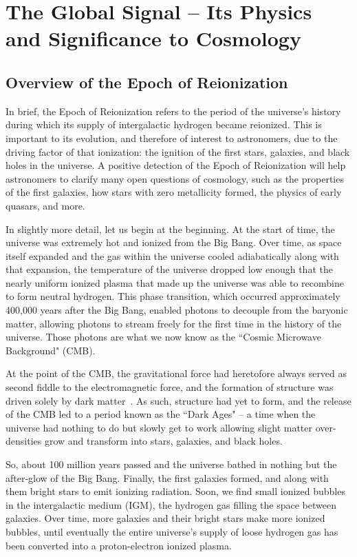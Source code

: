 \chapter{The Global Signal -- Its Physics and Significance to Cosmology}

\section{Overview of the Epoch of Reionization}

In brief, the Epoch of Reionization refers to the period of the universe's 
history during which its supply of intergalactic hydrogen became reionized.  
This is important to its evolution, and therefore of interest to astronomers, 
due to the driving factor of that ionization: the ignition of the first stars, 
galaxies, and black holes in the universe. A positive detection of the Epoch of 
Reionization will help astronomers to clarify many open questions of cosmology, 
such as the properties of the first galaxies, how stars with zero metallicity 
formed, the physics of early quasars, and more.

In slightly more detail, let us begin at the beginning. At the start of time, 
the universe was extremely hot and ionized from the Big Bang. Over time, as 
space itself expanded and the gas within the universe cooled adiabatically 
along with that expansion, the temperature of the universe dropped low enough 
that the nearly uniform ionized plasma that made up the universe was able to 
recombine to form neutral hydrogen. This phase transition, which occurred 
approximately 400,000 years after the Big Bang, enabled photons to decouple 
from the baryonic matter, allowing photons to stream freely for the first time 
in the history of the universe.  Those photons are what we now know as the 
``Cosmic Microwave Background" (CMB).

At the point of the CMB, the gravitational force had heretofore always served 
as second fiddle to the electromagnetic force, and the formation of structure 
was driven solely by dark matter~\citep{zaroubi2012}.  As such, structure had 
yet to form, and the release of the CMB led to a period known as the ``Dark 
Ages" -- a time when the universe had nothing to do but slowly get to work 
allowing slight matter over-densities grow and transform into stars, galaxies, 
and black holes.

So, about 100 million years passed and the universe bathed in nothing but the 
after-glow of the Big Bang. Finally, the first galaxies formed, and along with 
them bright stars to emit ionizing radiation. Soon, we find small ionized 
bubbles in the intergalactic medium (IGM), the hydrogen gas filling the space 
between galaxies. Over time, more galaxies and their bright stars make more 
ionized bubbles, until eventually the entire universe's supply of loose 
hydrogen gas has been converted into a proton-electron ionized plasma.

